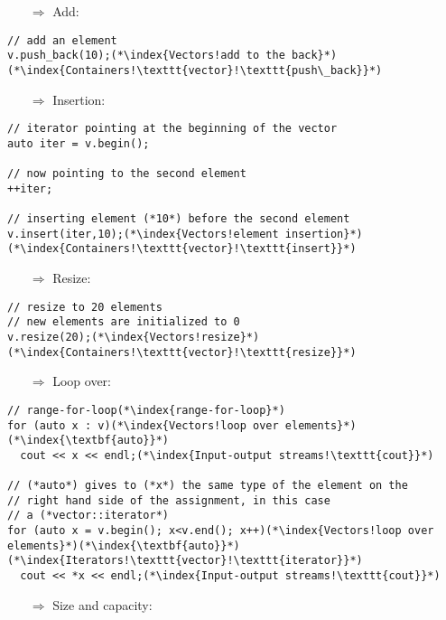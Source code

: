 \documentclass[10pt]{book}
\begin{document}
\begin{enumerate}
\item[$\Rightarrow$] Add:
\end{enumerate}
\begin{lstlisting}
// add an element
v.push_back(10);(*\index{Vectors!add to the back}*)(*\index{Containers!\texttt{vector}!\texttt{push\_back}}*)
\end{lstlisting}
\begin{enumerate}
\item[$\Rightarrow$] Insertion:
\end{enumerate}
\begin{lstlisting}
// iterator pointing at the beginning of the vector
auto iter = v.begin();

// now pointing to the second element
++iter;

// inserting element (*10*) before the second element
v.insert(iter,10);(*\index{Vectors!element insertion}*)(*\index{Containers!\texttt{vector}!\texttt{insert}}*)
\end{lstlisting}
\begin{enumerate}
\item[$\Rightarrow$] Resize:
\end{enumerate}
\begin{lstlisting}
// resize to 20 elements
// new elements are initialized to 0
v.resize(20);(*\index{Vectors!resize}*)(*\index{Containers!\texttt{vector}!\texttt{resize}}*)
\end{lstlisting}
\begin{enumerate}
\item[$\Rightarrow$] Loop over:
\end{enumerate}
\begin{lstlisting}
// range-for-loop(*\index{range-for-loop}*)
for (auto x : v)(*\index{Vectors!loop over elements}*)(*\index{\textbf{auto}}*)
  cout << x << endl;(*\index{Input-output streams!\texttt{cout}}*)

// (*auto*) gives to (*x*) the same type of the element on the
// right hand side of the assignment, in this case
// a (*vector::iterator*)
for (auto x = v.begin(); x<v.end(); x++)(*\index{Vectors!loop over elements}*)(*\index{\textbf{auto}}*)(*\index{Iterators!\texttt{vector}!\texttt{iterator}}*)
  cout << *x << endl;(*\index{Input-output streams!\texttt{cout}}*)
\end{lstlisting}
\begin{enumerate}
\item[$\Rightarrow$] Size and capacity:
\end{enumerate}
\end{document}
